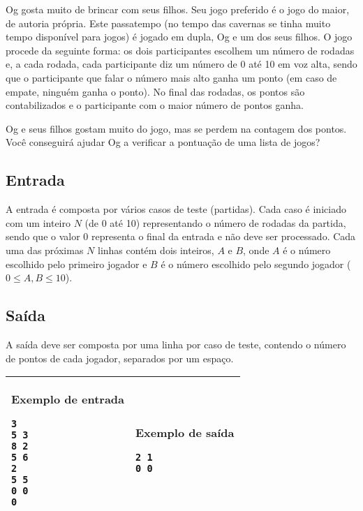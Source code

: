 Og gosta muito de brincar com seus filhos. Seu jogo preferido é o jogo do maior,
de autoria própria. Este passatempo (no tempo das cavernas se tinha muito
tempo disponível para jogos) é jogado em dupla, Og e um dos seus
filhos. O jogo procede da seguinte forma: os dois participantes escolhem um
número de rodadas e, a cada rodada, cada participante diz um número de 0 até
10 em voz alta, sendo que o participante que falar o número mais alto ganha
um ponto (em caso de empate, ninguém ganha o ponto). No final das rodadas, os
pontos são contabilizados e o participante com o maior número de pontos
ganha.

Og e seus filhos gostam muito do jogo, mas se perdem na contagem dos pontos.
Você conseguirá ajudar Og a verificar a pontuação de uma lista de jogos?


\subsection*{Entrada}

A entrada é composta por vários casos de teste (partidas). Cada caso é iniciado
com um inteiro $N$ (de 0 até 10) representando o número de rodadas da partida,
sendo que o valor 0 representa o final da entrada e não deve ser processado.
Cada uma das próximas $N$ linhas contém dois inteiros, $A$ e $B$, onde $A$ é o
número escolhido pelo primeiro jogador e $B$ é o número escolhido pelo segundo
jogador ($0 \leq A, B \leq 10$).

\subsection*{Saída}

A saída deve ser composta por uma linha por caso de teste, contendo o número de
pontos de cada jogador, separados por um espaço.

\begin{table}[!h]
\centering
\begin{tabular}{|l|l|}
\hline
\begin{minipage}[t]{3in}
\textbf{Exemplo de entrada}
\begin{verbatim}
3
5 3
8 2
5 6
2
5 5
0 0
0
\end{verbatim}
\vspace{1mm}
\end{minipage}
&

\begin{minipage}[t]{3in}
\textbf{Exemplo de saída}
\begin{verbatim}
2 1
0 0
\end{verbatim}
\vspace{1mm}
\end{minipage} \\
\hline
\end{tabular}
\end{table}

\newpage
